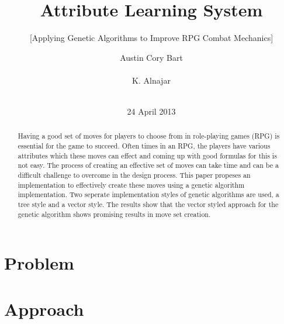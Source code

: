 \documentclass{acm_proc_article-sp}
\begin{document}
\title{Attribute Learning System}
\subtitle{[Applying Genetic Algorithms to Improve RPG Combat Mechanics]} %



\author{
\alignauthor
Austin Cory Bart\\
       \\
\alignauthor
K. Alnajar\\
       \\
\alignauthor
}

\date{24 April 2013}

\maketitle
\begin{abstract}
Having a good set of moves for players to choose from in role-playing games (RPG) is essential for the game to succeed.  Often times in an RPG, the players have various attributes which these moves can effect and coming up with good formulas for this is not easy. The process of creating an effective set of moves can take time and can be a difficult challenge to overcome in the design process. This paper propeses an implementation to effectively create these moves using a genetic algorithm implementation. Two seperate implementation styles of genetic algorithms are used, a tree style and a vector style. The results show that the vector styled approach for the genetic algorithm shows promising results in move set creation.
\end{abstract}




\section{Problem}
	
\section{Approach}
\end{document}
